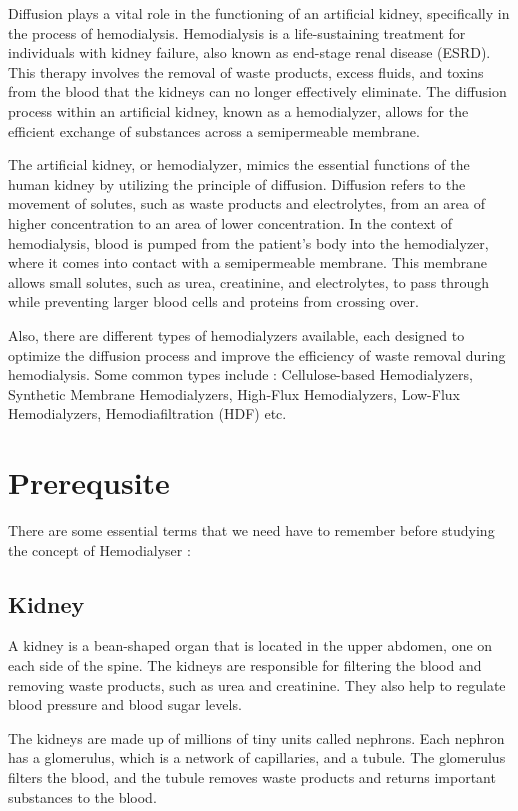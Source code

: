 \documentclass[12pt, a4paper]{article} %
\begin{document}
Diffusion plays a vital role in the functioning of an artificial kidney, specifically in the process of hemodialysis. Hemodialysis is a life-sustaining treatment for individuals with kidney failure, also known as end-stage renal disease (ESRD). This therapy involves the removal of waste products, excess fluids, and toxins from the blood that the kidneys can no longer effectively eliminate. The diffusion process within an artificial kidney, known as a hemodialyzer, allows for the efficient exchange of substances across a semipermeable membrane.

The artificial kidney, or hemodialyzer, mimics the essential functions of the human kidney by utilizing the principle of diffusion. Diffusion refers to the movement of solutes, such as waste products and electrolytes, from an area of higher concentration to an area of lower concentration. In the context of hemodialysis, blood is pumped from the patient's body into the hemodialyzer, where it comes into contact with a semipermeable membrane. This membrane allows small solutes, such as urea, creatinine, and electrolytes, to pass through while preventing larger blood cells and proteins from crossing over.

Also, there are different types of hemodialyzers available, each designed to optimize the diffusion process and improve the efficiency of waste removal during hemodialysis. Some common types include : Cellulose-based Hemodialyzers, Synthetic Membrane Hemodialyzers, High-Flux Hemodialyzers, Low-Flux Hemodialyzers, Hemodiafiltration (HDF) etc.

\section{Prerequsite}

There are some essential terms that we need have to remember before studying the concept of Hemodialyser :



\subsection{Kidney}
A kidney is a bean-shaped organ that is located in the upper abdomen, one on each side of the spine. The kidneys are responsible for filtering the blood and removing waste products, such as urea and creatinine. They also help to regulate blood pressure and blood sugar levels.

The kidneys are made up of millions of tiny units called nephrons. Each nephron has a glomerulus, which is a network of capillaries, and a tubule. The glomerulus filters the blood, and the tubule removes waste products and returns important substances to the blood.
\end{document}
